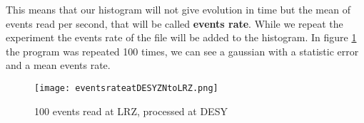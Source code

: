 This means that our histogram will not give evolution in time but the mean of events read per second, that will be called \textbf{events rate}. While we repeat the experiment the events rate of the file will be added to the histogram. In figure \ref{fig:eventsrateatDESYZNtoLRZ} the program was repeated 100 times, we can see a gaussian with a statistic error and a mean events rate.


\begin{figure}
	\texttt{[image: eventsrateatDESYZNtoLRZ.png]}
	\caption{100 events read at LRZ, processed at DESY} 
	\label{fig:eventsrateatDESYZNtoLRZ}
\end{figure}
